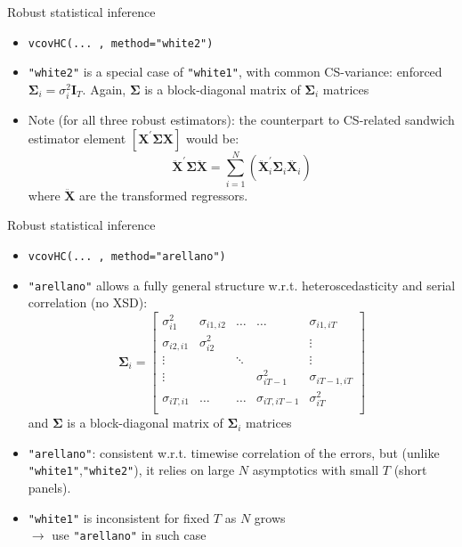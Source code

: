 \documentclass[usenames,dvipsnames]{beamer}
\begin{document}
\begin{frame}{Robust statistical inference}
\begin{itemize}
    \item \texttt{vcovHC(... , method="white2")}
    \medskip
    \item \texttt{"white2"} is a special case of \texttt{"white1"}, with common CS-variance: enforced $\bm{\Sigma}_i = \sigma^2_i \bm{I}_T$. Again, $\bm{\Sigma}$ is a block-diagonal matrix of $\bm{\Sigma}_i$ matrices
    \vspace{1.5cm}
    \item Note (for all three robust estimators): the counterpart to CS-related sandwich estimator element $\left[ \bm{X}^{\prime} \bm{\Sigma} \bm{X} \right]$ would be:
    $$
    \ddot{\bm{X}}^{\prime} \bm{\Sigma} \ddot{\bm{X}} = 
    \sum_{i=1}^N \left( 
    \ddot{\bm{X}}_i^{\prime} \bm{\Sigma}_i \ddot{\bm{X}_i}
    \right)
    $$
    where $\ddot{\bm{X}}$ are the transformed regressors.\\ 
\end{itemize}
\end{frame}
\begin{frame}{Robust statistical inference}
\begin{itemize}
    \item \texttt{vcovHC(... , method="arellano")}
    \medskip
    \item \texttt{"arellano"} allows a fully general structure w.r.t. heteroscedasticity and serial correlation (no XSD):
    $$
    \bm{\Sigma}_i = 
    \begin{bmatrix}
    \sigma_{i1}^2 & \sigma_{i1,i2} & \dots & \dots & \sigma_{i1,iT} \\
    \sigma_{i2,i1} & \sigma_{i2}^2 &       &       & \vdots \\
    \vdots         &               & \ddots &      & \vdots \\
   \vdots         &               &  &  \sigma_{iT-1}^2    & \sigma_{iT-1,iT} \\
   \sigma_{iT,i1}       &   \dots & \dots    &  \sigma_{iT,iT-1}    & \sigma_{iT}^2 \\
    \end{bmatrix}
    $$
    and $\bm{\Sigma}$ is a block-diagonal matrix of $\bm{\Sigma}_i$ matrices
    \smallskip
    \item \texttt{"arellano"}: consistent w.r.t. timewise correlation of the errors, but (unlike \texttt{"white1"},\texttt{"white2"}), it relies on large $N$ asymptotics with small $T$ (short panels).
    \smallskip
    \item \texttt{"white1"} is inconsistent for fixed $T$ as $N$ grows \\$\rightarrow$ use \texttt{"arellano"} in such case 
\end{itemize}
\end{frame}
\end{document}
